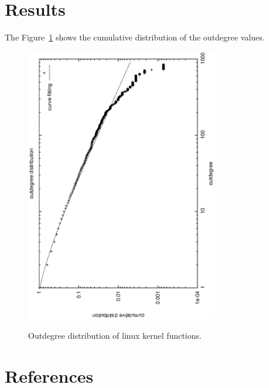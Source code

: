 \documentclass[a4paper, 10pt]{iopart}
\begin{document}
\section{Results}
The Figure~\ref{fig:outdegree} shows the cumulative distribution of
the outdegree values.

\begin{figure}[ht]
  \includegraphics[width=0.75\textwidth]{img/curve}
  \label{fig:outdegree}
  \caption{Outdegree distribution of linux kernel functions.}
\end{figure}


\section*{References}
\end{document}
